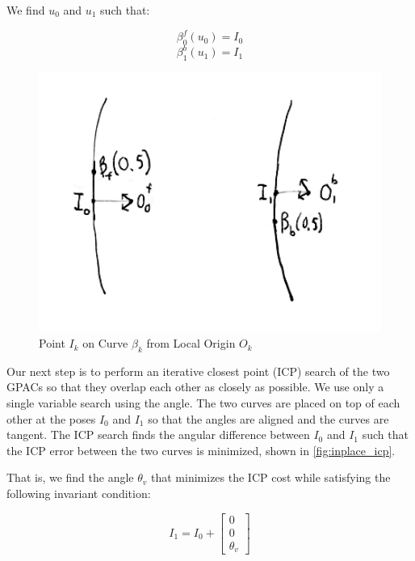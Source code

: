 We find $u_0$ and $u_1$ such that:


\begin{equation}
\beta_0^f(u_0) = I_0
\end{equation}
\begin{equation}
\beta_1^b(u_1) = I_1
\end{equation}


\begin{figure}[htbp]
\centering
\includegraphics[keepaspectratio,width=400pt,height=0.75\textheight]{5_local_origin.png}
\caption{Point $I_k$ on Curve $\beta_k$ from Local Origin $O_k$}
\label{fig:local_origin}
\end{figure}



Our next step is to perform an iterative closest point (ICP) search of the two GPACs so that they overlap each other as closely as possible. We use only a single variable search using the angle. The two curves are placed on top of each other at the poses $I_0$ and $I_1$ so that the angles are aligned and the curves are tangent. The ICP search finds the angular difference between $I_0$ and $I_1$ such that the ICP error between the two curves is minimized, shown in \autoref{fig:inplace_icp}.

That is, we find the angle $\theta_v$ that minimizes the ICP cost while satisfying the following invariant condition:


\begin{equation}
I_1 = I_0 +
\begin{bmatrix}
0 \\
0 \\
\theta_v
\end{bmatrix}
\end{equation}


